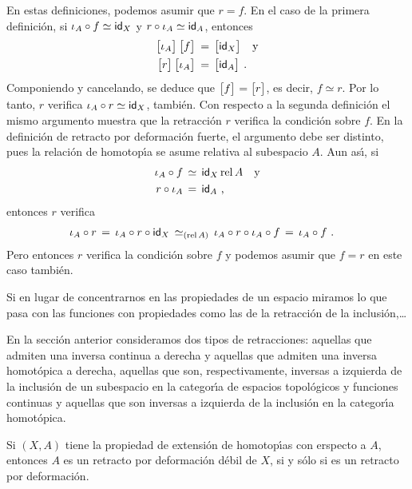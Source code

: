 En estas definiciones, podemos asumir que $r=f$. En el caso de la primera
definici\'{o}n, si $\inc[A]\circ f\simeq\id[X]$ y $r\circ\inc[A]\simeq\id[A]$,
entonces
\begin{align*}
	\clase{\inc[A]}\,\clase{f} & \,=\,\clase{\id[X]}\quad\text{y} \\
	\clase{r}\,\clase{\inc[A]} & \,=\,\clase{\id[A]}
	\text{ .}
\end{align*}
%
Componiendo y cancelando, se deduce que $\clase{f}=\clase{r}$, es decir,
$f\simeq r$. Por lo tanto, $r$ verifica $\inc[A]\circ r\simeq\id[X]$,
tambi\'{e}n. Con respecto a la segunda definici\'{o}n el mismo argumento
muestra que la retracci\'{o}n $r$ verifica la condici\'{o}n sobre $f$.
En la definici\'{o}n de retracto por deformaci\'{o}n fuerte, el argumento debe
ser distinto, pues la relaci\'{o}n de homotop\'{\i}a se asume relativa al
subespacio $A$. Aun as\'{\i}, si
\begin{align*}
	\inc[A]\circ f & \,\simeq\,\id[X]\,\rel{A}\quad\text{y} \\
	r\circ\inc[A] & \,=\,\id[A]
	\text{ ,}
\end{align*}
%
entonces $r$ verifica
\begin{align*}
	\inc[A]\circ r & \,=\,\inc[A]\circ r\circ\id[X]
		\,\simeq_{(\rel{A})}\,\inc[A]\circ r\circ\inc[A]\circ f
		\,=\,\inc[A]\circ f
	\text{ .}
\end{align*}
%
Pero entonces $r$ verifica la condici\'{o}n sobre $f$ y podemos asumir que
$f=r$ en este caso tambi\'{e}n.


Si en lugar de concentrarnos en las propiedades de un espacio miramos
lo que pasa con las funciones con propiedades como las de la retracci\'{o}n
de la inclusi\'{o}n,\dots

En la secci\'{o}n anterior consideramos dos tipos de retracciones:
aquellas que admiten una inversa continua a derecha y aquellas que admiten
una inversa homot\'{o}pica a derecha, aquellas que son, respectivamente,
inversas a izquierda de la inclusi\'{o}n de un subespacio en la categor\'{\i}a
de espacios topol\'{o}gicos y funciones continuas y aquellas que son
inversas a izquierda de la inclusi\'{o}n en la categor\'{\i}a homot\'{o}pica.


\begin{coroExtensionDeHomotopiasRetractoEquivaleARetractoDebil}
	Si $(X,A)$ tiene la propiedad de extensi\'{o}n de homotop\'{\i}as
	con erspecto a $A$, entonces $A$ es un retracto por deformaci\'{o}n
	d\'{e}bil de $X$, si y s\'{o}lo si es un retracto por deformaci\'{o}n.
\end{coroExtensionDeHomotopiasRetractoEquivaleARetractoDebil}

